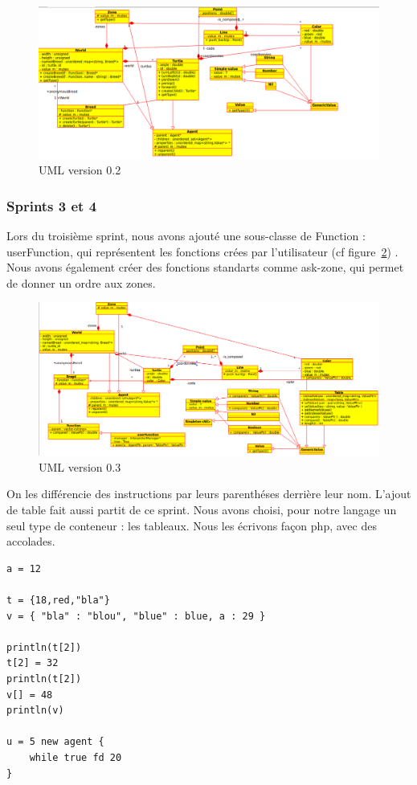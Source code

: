 \begin{figure}[h]
\includegraphics[scale=0.45]{doc/report/uml/v02.png}
\caption{\label{v0.2} UML version 0.2}
\end{figure}
\subsubsection{Sprints 3 et 4}
Lors du troisième sprint, nous avons ajouté une sous-classe de Function : userFunction, qui représentent les fonctions crées par l'utilisateur (cf figure~\ref{v0.3}) . Nous avons également créer des fonctions standarts comme ask-zone, qui permet de donner un ordre aux zones.
\begin{figure}[h]
\includegraphics[scale=0.4]{doc/report/uml/v03.png}
\caption{\label{v0.3} UML version 0.3}
\end{figure}

On les différencie des instructions par leurs parenthéses derrière leur nom.
L'ajout de table fait aussi partit de ce sprint. Nous avons choisi, pour notre langage un seul type de conteneur : les tableaux.
Nous les écrivons façon php, avec des accolades.
\begin{lstlisting}
a = 12

t = {18,red,"bla"}
v = { "bla" : "blou", "blue" : blue, a : 29 }

println(t[2])
t[2] = 32
println(t[2])
v[] = 48
println(v)

u = 5 new agent {
	while true fd 20
}
\end{lstlisting}

